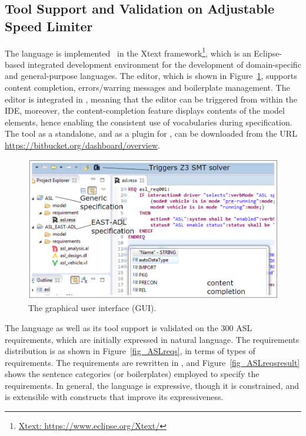 \subsection*{Tool Support and Validation on Adjustable Speed Limiter}
The \resa{} language is implemented~\cite{resatool} in the Xtext framework\footnote{\url{Xtext: https://www.eclipse.org/Xtext/}}, which is an Eclipse-based integrated development environment for the development of domain-specific and general-purpose languages. The \resa{} editor, which is shown in Figure~\ref{fig_resagui}, supports content completion, errors/warring messages and boilerplate management. The editor is integrated in \eatop, meaning that the editor can be triggered from within the IDE, moreover, the content-completion feature displays contents of the \eastadl{} model elements, hence enabling the consistent use of vocabularies during specification. The \resa{} tool as a standalone, and as a plugin for \eatop{}, can be downloaded from the URL {\small \url{https://bitbucket.org/dashboard/overview}}. 
\begin{figure}[h]
	\centering
	\includegraphics[width=1\linewidth]{images/resagui}
	\caption{The \resa{} graphical user interface (GUI).}
	\label{fig_resagui}
\end{figure}

The language as well as its tool support is validated on the 300 ASL requirements, which are initially expressed in natural language. The requirements distribution is as shown in Figure~\ref{fig_ASLreqs}, in terms of types of requirements. The requirements are rewritten in \resa, and Figure~\ref{fig_ASLreqsresult} shows the sentence categories (or boilerplates) employed to specify the requirements. In general, the language is expressive, though it is constrained, and is extensible with constructs that improve its expressiveness.

